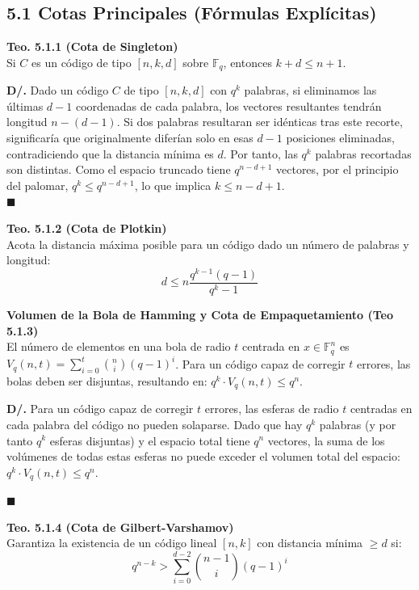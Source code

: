 \documentclass{article}
\begin{document}
\subsection{5.1 Cotas Principales (Fórmulas Explícitas)}

\textbf{Teo. 5.1.1 (Cota de Singleton)}\\
Si $C$ es un código de tipo $[n, k, d]$ sobre $\mathbb{F}_{q}$, entonces $k+d \le n+1$.

\noindent\textbf{D/. }
    Dado un código $C$ de tipo $[n,k,d]$ con $q^k$ palabras, si eliminamos las últimas $d-1$ coordenadas de cada palabra, los vectores resultantes tendrán longitud $n - (d - 1)$. Si dos palabras resultaran ser idénticas tras este recorte, significaría que originalmente diferían solo en esas $d-1$ posiciones eliminadas, contradiciendo que la distancia mínima es $d$. Por tanto, las $q^k$ palabras recortadas son distintas. Como el espacio truncado tiene $q^{n-d+1}$ vectores, por el principio del palomar, $q^k \le q^{n-d+1}$, lo que implica $k \le n - d + 1$. \\
    
 \noindent$\blacksquare$

\vspace{0.3cm}
\textbf{Teo. 5.1.2 (Cota de Plotkin)}\\
Acota la distancia máxima posible para un código dado un número de palabras y longitud:
\[d \le n \frac{q^{k-1}(q-1)}{q^k - 1}\]

\vspace{0.3cm}
\textbf{Volumen de la Bola de Hamming y Cota de Empaquetamiento (Teo 5.1.3)}\\
El número de elementos en una bola de radio $t$ centrada en $x \in \mathbb{F}_q^n$ es $V_q(n,t) = \sum_{i=0}^t \binom{n}{i} (q-1)^i$. Para un código capaz de corregir $t$ errores, las bolas deben ser disjuntas, resultando en: $q^k \cdot V_q(n,t) \le q^n$.

\noindent\textbf{D/. }
    Para un código capaz de corregir $t$ errores, las esferas de radio $t$ centradas en cada palabra del código no pueden solaparse. Dado que hay $q^k$ palabras (y por tanto $q^k$ esferas disjuntas) y el espacio total tiene $q^n$ vectores, la suma de los volúmenes de todas estas esferas no puede exceder el volumen total del espacio: $q^k \cdot V_q(n,t) \le q^n$.
    
 \noindent$\blacksquare$

\textbf{Teo. 5.1.4 (Cota de Gilbert-Varshamov)}\\
Garantiza la existencia de un código lineal $[n,k]$ con distancia mínima $\ge d$ si:
\[q^{n-k} > \sum_{i=0}^{d-2} \binom{n-1}{i}(q-1)^i\]
\end{document}
